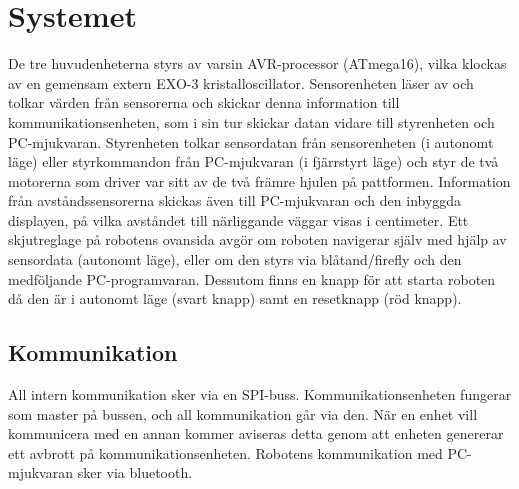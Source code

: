 %

\section{Systemet}

De tre huvudenheterna styrs av varsin AVR-processor (ATmega16), vilka klockas 
av en gemensam extern EXO-3 kristalloscillator. Sensorenheten läser av och 
tolkar värden från sensorerna och skickar denna information till 
kommunikationsenheten, som i sin tur skickar datan vidare till styrenheten 
och PC-mjukvaran. Styrenheten tolkar sensordatan från 
sensorenheten (i autonomt läge) eller styrkommandon från PC-mjukvaran 
(i fjärrstyrt läge) och styr de två motorerna som driver var sitt av de två 
främre hjulen på pattformen. Information från avståndssensorerna skickas även
till PC-mjukvaran och den inbyggda displayen, på vilka avståndet till 
närliggande väggar visas i centimeter.  Ett skjutreglage på robotens ovansida 
avgör om roboten navigerar själv med hjälp av sensordata (autonomt läge), 
eller om den styrs via blåtand/firefly och den medföljande PC-programvaran. 
Dessutom finns en knapp för att starta roboten då den är i autonomt läge 
(svart knapp) samt en resetknapp (röd knapp).



\subsection{Kommunikation}
All intern kommunikation sker via en SPI-buss. Kommunikationsenheten fungerar som master på bussen, och all kommunikation går via den. När en enhet vill kommunicera med en annan kommer aviseras detta genom att enheten genererar ett avbrott på kommunikationsenheten. 
Robotens kommunikation med PC-mjukvaran sker via bluetooth.
